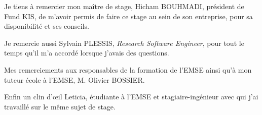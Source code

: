 Je tiens à remercier mon maître de stage, Hicham BOUHMADI, président de Fund KIS, de m'avoir permis de faire ce stage au sein de son entreprise, pour sa disponibilité et ses conseils.

\vspace{3mm}

Je remercie aussi Sylvain  PLESSIS, \textit{Research Software Engineer}, pour tout le temps qu'il m'a accordé lorsque j'avais des questions.

\vspace{3mm}

Mes remerciements aux responsables de la formation de l'EMSE ainsi qu'à mon tuteur école à l'EMSE, M. Olivier BOSSIER.

\vspace{3mm}

Enfin un clin d'\oe il Leticia, étudiante à l'EMSE et stagiaire-ingénieur avec qui j'ai travaillé sur le même sujet de stage.
